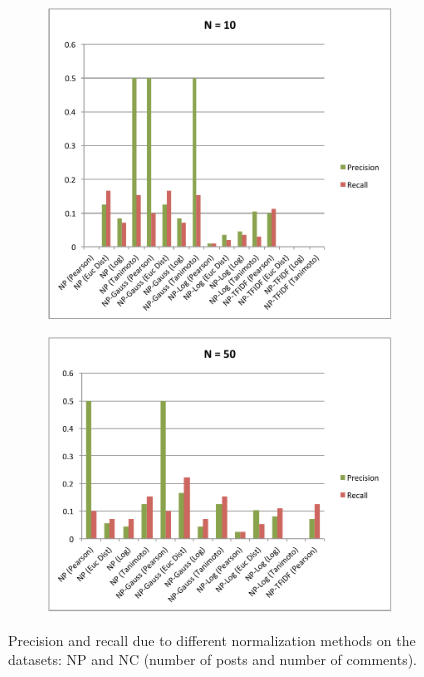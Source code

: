 \documentclass{article}
\begin{document}
\begin{figure}[H]
\centering
\begin{subfigure}[t]{.47\textwidth}
  \centering
  \includegraphics[width=0.9\linewidth]{img/norm-n10.pdf}
  \label{fig:norm-n10}
\end{subfigure}
\begin{subfigure}[t]{.47\textwidth}
  \centering
  \includegraphics[width=.9\linewidth]{img/norm-n50.pdf}
  \label{fig:norm-n50}
\end{subfigure}
\caption{Precision and recall due to different normalization methods on the datasets: NP and NC (number
of posts and number of comments).}\label{fig:tfidf-p}
\end{figure}
 
\end{document}
